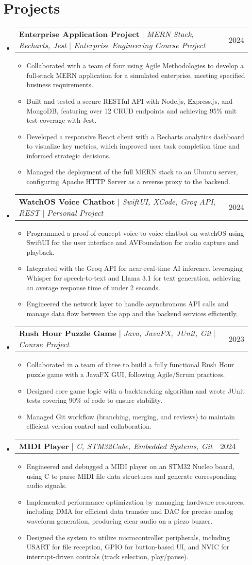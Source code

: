 \documentclass[letterpaper,11pt]{article}
\makeatletter
\newcommand{\resumeItem}[1]{
  \item\small{
    {#1 \vspace{-2pt}}
  }
}
\newcommand{\resumeProjectHeading}[2]{
    \item
    \begin{tabular*}{0.97\textwidth}{l@{\extracolsep{\fill}}r}
      \small#1 & #2 \\
    \end{tabular*}\vspace{-7pt}
}
\newcommand{\resumeSubHeadingListStart}{\begin{itemize}[leftmargin=0.15in, label={}]}
\newcommand{\resumeSubHeadingListEnd}{\end{itemize}}
\newcommand{\resumeItemListStart}{\begin{itemize}}
\newcommand{\resumeItemListEnd}{\end{itemize}\vspace{-5pt}}
\makeatother
\begin{document}
\section{Projects}
    \resumeSubHeadingListStart
    \resumeProjectHeading
    {\textbf{Enterprise Application Project} $|$ \emph{MERN Stack, Recharts, Jest} $|$ \emph{Enterprise Engineering Course Project}}{2024}
    \resumeItemListStart
      \resumeItem{Collaborated with a team of four using Agile Methodologies to develop a full-stack MERN application for a simulated enterprise, meeting specified business requirements.}
      \resumeItem{Built and tested a secure RESTful API with Node.js, Express.js, and MongoDB, featuring over 12 CRUD endpoints and achieving 95\% unit test coverage with Jest.}
      \resumeItem{Developed a responsive React client with a Recharts analytics dashboard to visualize key metrics, which improved user task completion time and informed strategic decisions.}
      \resumeItem{Managed the deployment of the full MERN stack to an Ubuntu server, configuring Apache HTTP Server as a reverse proxy to the backend.}
    \resumeItemListEnd
    \resumeProjectHeading
        {\textbf{WatchOS Voice Chatbot} $|$ \emph{SwiftUI, XCode, Groq API, REST} $|$ \emph{Personal Project}}{2024}
        \resumeItemListStart
            \resumeItem{Programmed a proof-of-concept voice-to-voice chatbot on watchOS using SwiftUI for the user interface and AVFoundation for audio capture and playback.}
            \resumeItem{Integrated with the Groq API for near-real-time AI inference, leveraging Whisper for speech-to-text and Llama 3.1 for text generation, achieving an average response time of under 2 seconds.}
            \resumeItem{Engineered the network layer to handle asynchronous API calls and manage data flow between the app and the backend services efficiently.}
        \resumeItemListEnd
    \resumeProjectHeading
        {\textbf{Rush Hour Puzzle Game} $|$ \emph{Java, JavaFX, JUnit, Git} $|$ \emph{Course Project}}{2023}
        \resumeItemListStart
            \resumeItem{Collaborated in a team of three to build a fully functional Rush Hour puzzle game with a JavaFX GUI, following Agile/Scrum practices.}
            \resumeItem{Designed core game logic with a backtracking algorithm and wrote JUnit tests covering 90\% of code to ensure stability.}
            \resumeItem{Managed Git workflow (branching, merging, and reviews) to maintain efficient version control and collaboration.}
        \resumeItemListEnd
    \resumeProjectHeading
        {\textbf{MIDI Player} $|$ \emph{C, STM32Cube, Embedded Systems, Git}}{2024}
        \resumeItemListStart
            \resumeItem{Engineered and debugged a MIDI player on an STM32 Nucleo board, using C to parse MIDI file data structures and generate corresponding audio signals.}
            \resumeItem{Implemented performance optimization by managing hardware resources, including DMA for efficient data transfer and DAC for precise analog waveform generation, producing clear audio on a piezo buzzer.}
            \resumeItem{Designed the system to utilize microcontroller peripherals, including USART for file reception, GPIO for button-based UI, and NVIC for interrupt-driven controls (track selection, play/pause).}
        \resumeItemListEnd
    \resumeSubHeadingListEnd
\end{document}
